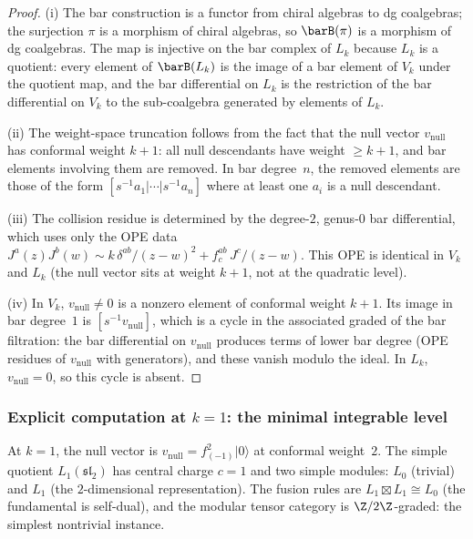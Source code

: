 \begin{proof}
(i) The bar construction is a functor from chiral algebras to
dg coalgebras; the surjection $\pi$ is a morphism of chiral
algebras, so $\barB(\pi)$ is a morphism of dg coalgebras.
The map is injective on the bar complex of $L_k$ because
$L_k$ is a quotient: every element of $\barB(L_k)$ is the
image of a bar element of $V_k$ under the quotient map, and
the bar differential on $L_k$ is the restriction of the bar
differential on $V_k$ to the sub-coalgebra generated by
elements of $L_k$.

(ii) The weight-space truncation follows from the fact that
the null vector $v_{\mathrm{null}}$ has conformal weight
$k + 1$: all null descendants have weight $\ge k + 1$, and
bar elements involving them are removed. In bar degree~$n$,
the removed elements are those of the form
$[s^{-1} a_1 | \cdots | s^{-1} a_n]$ where at least one
$a_i$ is a null descendant.

(iii) The collision residue is determined by the degree-$2$,
genus-$0$ bar differential, which uses only the OPE data
$J^a(z) J^b(w) \sim k\,\delta^{ab}/(z-w)^2 + f^{ab}_c\,J^c/(z-w)$.
This OPE is identical in $V_k$ and $L_k$ (the null vector
sits at weight $k+1$, not at the quadratic level).

(iv) In $V_k$, $v_{\mathrm{null}} \ne 0$ is a nonzero
element of conformal weight $k + 1$. Its image in bar
degree~$1$ is $[s^{-1} v_{\mathrm{null}}]$, which is a
cycle in the associated graded of the bar filtration: the
bar differential on $v_{\mathrm{null}}$ produces terms of
lower bar degree (OPE residues of $v_{\mathrm{null}}$ with
generators), and these vanish modulo the ideal. In $L_k$,
$v_{\mathrm{null}} = 0$, so this cycle is absent.
\end{proof}


\subsubsection{Explicit computation at $k = 1$: the minimal
 integrable level}
\label{subsubsec:bar-k-equals-1}

At $k = 1$, the null vector is
$v_{\mathrm{null}} = f_{(-1)}^2 |0\rangle$ at conformal
weight~$2$. The simple quotient $L_1(\mathfrak{sl}_2)$ has
central charge $c = 1$ and two simple modules: $L_0$
(trivial) and $L_1$ (the $2$-dimensional representation).
The fusion rules are $L_1 \boxtimes L_1 \cong L_0$
(the fundamental is self-dual), and the modular tensor category
is $\Z/2\Z$-graded: the simplest nontrivial instance.

